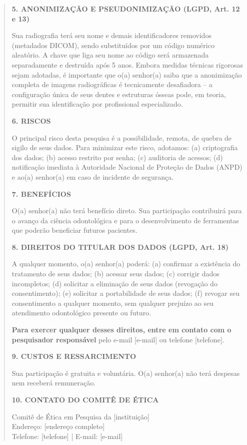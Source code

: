 \begin{quote}
\textbf{5. ANONIMIZAÇÃO E PSEUDONIMIZAÇÃO (LGPD, Art. 12 e 13)}

Sua radiografia terá seu nome e demais identificadores removidos (metadados
DICOM), sendo substituídos por um código numérico aleatório. A chave que liga
seu nome ao código será armazenada separadamente e destruída após 5 anos. Embora
medidas técnicas rigorosas sejam adotadas, é importante que o(a) senhor(a) saiba
que a anonimização completa de imagens radiográficas é tecnicamente desafiadora
-- a configuração única de seus dentes e estruturas ósseas pode, em teoria,
permitir sua identificação por profissional especializado.

\textbf{6. RISCOS}

O principal risco desta pesquisa é a possibilidade, remota, de quebra de sigilo
de seus dados. Para minimizar este risco, adotamos: (a) criptografia dos dados;
(b) acesso restrito por senha; (c) auditoria de acessos; (d) notificação imediata
à Autoridade Nacional de Proteção de Dados (ANPD) e ao(a) senhor(a) em caso de
incidente de segurança.

\textbf{7. BENEFÍCIOS}

O(a) senhor(a) não terá benefício direto. Sua participação contribuirá para o
avanço da ciência odontológica e para o desenvolvimento de ferramentas que
poderão beneficiar futuros pacientes.

\textbf{8. DIREITOS DO TITULAR DOS DADOS (LGPD, Art. 18)}

A qualquer momento, o(a) senhor(a) poderá: (a) confirmar a existência do
tratamento de seus dados; (b) acessar seus dados; (c) corrigir dados incompletos;
(d) solicitar a eliminação de seus dados (revogação do consentimento);
(e) solicitar a portabilidade de seus dados; (f) revogar seu consentimento a
qualquer momento, sem qualquer prejuízo ao seu atendimento odontológico presente
ou futuro.

\textbf{Para exercer qualquer desses direitos, entre em contato com o
pesquisador responsável} pelo e-mail [e-mail] ou telefone [telefone].

\textbf{9. CUSTOS E RESSARCIMENTO}

Sua participação é gratuita e voluntária. O(a) senhor(a) não terá despesas nem
receberá remuneração.

\textbf{10. CONTATO DO COMITÊ DE ÉTICA}

Comitê de Ética em Pesquisa da [instituição] \\
Endereço: [endereço completo] \\
Telefone: [telefone] | E-mail: [e-mail]


\end{quote}

